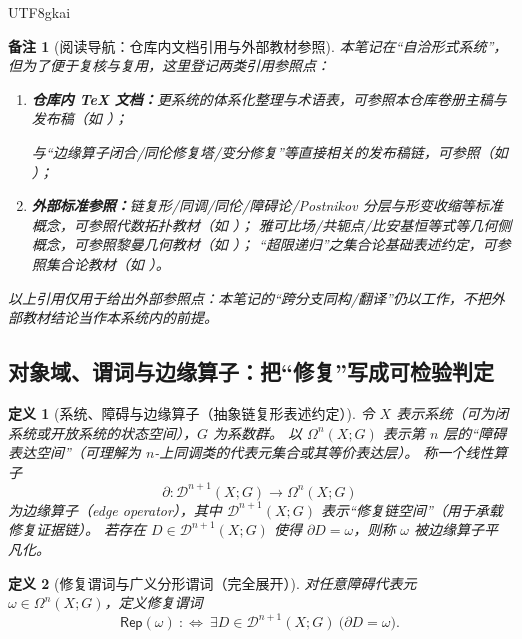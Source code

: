 \documentclass[12pt]{article}
\newtheorem{definition}{定义}[section]
\newtheorem{remark}{备注}[section]
\newcommand{\KouJing}{\texorpdfstring{表述约定}{表述约定}}
\begin{document}
\begin{CJK*}{UTF8}{gkai}
\begin{remark}[阅读导航：仓库内文档引用与外部教材参照]
本笔记在“自洽形式系统”，但为了便于复核与复用，这里登记两类引用参照点：
\begin{enumerate}
  \item \textbf{仓库内 TeX 文档：}更系统的体系化整理与术语表，可参照本仓库卷册主稿与发布稿（如 \cite{GaoZheng2025GFramework,GaoZhengAppVol1}）；

  与“边缘算子闭合/同伦修复塔/变分修复”等直接相关的发布稿链，可参照（如 \cite{RepoNB17EdgeOperator}）；
  \item \textbf{外部标准参照：}链复形/同调/同伦/障碍论/Postnikov 分层与形变收缩等标准概念，可参照代数拓扑教材（如 \cite{Hatcher2002AT,Switzer1975HomotopyHomology,
    Whitehead1978Elements}）；
  雅可比场/共轭点/比安基恒等式等几何侧概念，可参照黎曼几何教材（如 \cite{Lee2018RiemannianManifolds,Petersen2016RiemannianGeometry}）；
  “超限递归”之集合论基础\KouJing，可参照集合论教材（如 \cite{Jech2003SetTheory,Kunen2011SetTheory}）。
\end{enumerate}
以上引用仅用于给出外部参照点：本笔记的“跨分支同构/翻译”仍以工作，不把外部教材结论当作本系统内的前提。
\end{remark}

\subsection{对象域、谓词与边缘算子：把“修复”写成可检验判定}
\label{subsec:tex29-domain-predicates}

\begin{definition}[系统、障碍与边缘算子（抽象链复形\KouJing）]
令 $X$ 表示系统（可为闭系统或开放系统的状态空间），$G$ 为系数群。
以 $\Omega^n(X;G)$ 表示第 $n$ 层的“障碍表达空间”（可理解为 $n$-上同调类的代表元集合或其等价表达层）。
称一个线性算子
\[
  \partial:\mathcal{D}^{n+1}(X;G)\to \Omega^n(X;G)
\]
为边缘算子（edge operator），其中 $\mathcal{D}^{n+1}(X;G)$ 表示“修复链空间”（用于承载修复证据链）。
若存在 $D\in\mathcal{D}^{n+1}(X;G)$ 使得 $\partial D=\omega$，则称 $\omega$ 被边缘算子平凡化。
\end{definition}

\begin{definition}[修复谓词与广义分形谓词（完全展开）]
\label{def:tex29-rep-fr}
对任意障碍代表元 $\omega\in\Omega^n(X;G)$，定义修复谓词
\[
  \mathsf{Rep}(\omega)\ :\Longleftrightarrow\ \exists D\in\mathcal{D}^{n+1}(X;G)\ \bigl(\partial D=\omega\bigr).
\]


\end{definition}
\end{CJK*}
\end{document}
